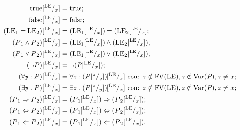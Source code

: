 \begin{definizione} 
\end{definizione}
\begin{align*}
  \mathrm{true}[^{\mathrm{LE}}/_ x ] 
    &= \mathrm{true};\\
  \mathrm{false}[^{\mathrm{LE}}/_ x ] 
    &= \mathrm{false};\\
  (\mathrm{LE}{_1} = \mathrm{LE}{_2})[^{\mathrm{LE}}/_ x ] 
    &= (\mathrm{LE}{_1}[^{\mathrm{LE}}/_ x ]) = (\mathrm{LE}{_2}[^{\mathrm{LE}}/_ x ]; \\
  (P{_1} \wedge P{_2})[^{\mathrm{LE}}/_ x ] 
    &= (\mathrm{LE}{_1}[^{\mathrm{LE}}/_ x ]) \wedge (\mathrm{LE}{_2}[^{\mathrm{LE}}/_x]);\\
  (P{_1} \vee P{_2})[^{\mathrm{LE}}/_ x ] 
    &= (\mathrm{LE}{_1}[^{\mathrm{LE}}/_ x ]) \vee (\mathrm{LE}{_2}[^{\mathrm{LE}}/_ x ]);\\
  (\neg P)[^{\mathrm{LE}}/_ x ] 
    &= \neg(P[^{\mathrm{LE}}/_ x ]);\\
  (\forall y\mathrel{:} P)[^{\mathrm{LE}}/_x ] 
    &= \forall z\mathrel{:} (P[^z/_y])[^{\mathrm{LE}}/_x] \text{ con: $z\notin\mathrm{FV}(\mathrm{LE}), z\notin\mathrm{Var}(P),z\neq x$};\\
  (\exists  y\mathrel{.} P)[^{\mathrm{LE}}/_x] 
    &= \exists z\mathrel{.} (P[^z/_y])[^{\mathrm{LE}}/_x] \text{ con: $z\notin\mathrm{FV}(\mathrm{LE}),  z\notin\mathrm{Var}(P), z\neq x$};\\
  (P{_1} \Rightarrow P{_2})[^{\mathrm{LE}}/_ x ] 
    &= (P{_1}[^{\mathrm{LE}}/_x]) \Rightarrow (P{_2}[^{\mathrm{LE}}/_x]);\\
  (P{_1} \Leftrightarrow P{_2})[^{\mathrm{LE}}/_ x ] 
    &= (P{_1}[^{\mathrm{LE}}/_x]) \Leftrightarrow (P{_2}[^{\mathrm{LE}}/_x]); \\
  (P{_1} \Leftarrow P{_2})[^{\mathrm{LE}}/_x] 
    &= (P{_1}[^{\mathrm{LE}}/_x]) \Leftarrow (P{_2}[^{\mathrm{LE}}/_x]).
\end{align*}
